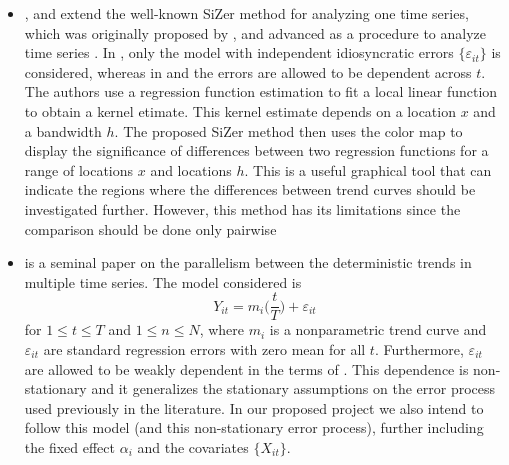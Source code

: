 \documentclass[a4paper,12pt]{article}
\begin{document}
\begin{itemize}[label=--,leftmargin=0.5cm]
\item \cite*{Park2008}, \cite*{ParkHannigKang2009} and \cite*{Park2009} extend the well-known SiZer method for analyzing one time series, which was originally proposed by \cite{ChaudhuriMarron1999}, and advanced as a procedure to analyze time series \cite{Rondonotti2007}. In \cite*{Park2008}, only the model with independent idiosyncratic errors $\{\varepsilon_{it}\}$ is considered, whereas in \cite*{ParkHannigKang2009} and \cite*{Park2009} the errors are allowed to be dependent across $t$. The authors use a regression function estimation to fit a local linear function to obtain a kernel etimate. This kernel estimate depends on a location $x$ and a bandwidth $h$. The proposed SiZer method then uses the color map to display the significance of differences between two regression functions for a range of locations $x$ and locations $h$. This is a useful graphical tool that can indicate the regions where the differences between trend curves should be investigated further. However, this method has its limitations since the comparison should be done only pairwise

\item \cite*{DegrasWu2012} is a seminal paper on the parallelism between the deterministic trends in multiple time series. The model considered is 
\begin{equation}\label{model-degras}
Y_{it} = m_i \Big( \frac{t}{T} \Big) + \varepsilon_{it}
\end{equation}
for $1 \le t \le T$ and $1 \le n \le N$, where $m_i$ is a nonparametric trend curve and $\varepsilon_{it}$ are standard regression errors with zero mean for all $t$. Furthermore, $\varepsilon_{it}$ are allowed to be weakly dependent in the terms of \cite{Wu2005}. This dependence is non-stationary and it generalizes the stationary assumptions on the error process used previously in the literature. In our proposed project we also intend to follow this model (and this non-stationary error process), further including the fixed effect $\alpha_i$ and the covariates $\{X_{it}\}$.


\end{itemize}
\end{document}
